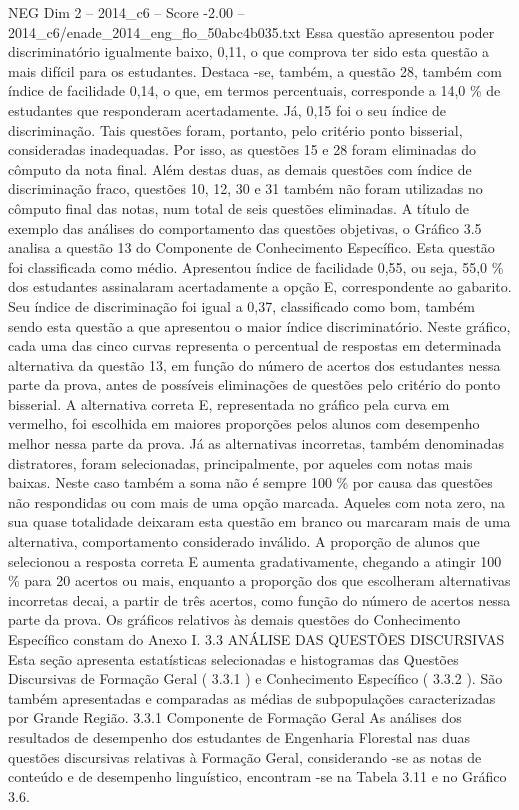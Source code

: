 \begin{textsample}{NEG Dim 2 – 2014\_c6 – Score -2.00 – 2014\_c6/enade\_2014\_eng\_flo\_50abc4b035.txt}
Essa questão apresentou poder discriminatório igualmente baixo, 0,11, o que comprova ter sido esta questão a mais difícil para os estudantes.
Destaca -se, também, a questão 28, também com índice de facilidade 0,14, o que, em termos percentuais, corresponde a 14,0 \% de estudantes que responderam acertadamente.
Já, 0,15 foi o seu índice de discriminação.
Tais questões foram, portanto, pelo critério ponto bisserial, consideradas inadequadas.
Por isso, as questões 15 e 28 foram eliminadas do cômputo da nota final.
Além destas duas, as demais questões com índice de discriminação fraco, questões 10, 12, 30 e 31 também não foram utilizadas no cômputo final das notas, num total de seis questões eliminadas.
A título de exemplo das análises do comportamento das questões objetivas, o Gráfico 3.5 analisa a questão 13 do Componente de Conhecimento Específico.
Esta questão foi classificada como médio.
Apresentou índice de facilidade 0,55, ou seja, 55,0 \% dos estudantes assinalaram acertadamente a opção E, correspondente ao gabarito.
Seu índice de discriminação foi igual a 0,37, classificado como bom, também sendo esta questão a que apresentou o maior índice discriminatório.
Neste gráfico, cada uma das cinco curvas representa o percentual de respostas em determinada alternativa da questão 13, em função do número de acertos dos estudantes nessa parte da prova, antes de possíveis eliminações de questões pelo critério do ponto bisserial.
A alternativa correta E, representada no gráfico pela curva em vermelho, foi escolhida em maiores proporções pelos alunos com desempenho melhor nessa parte da prova.
Já as alternativas incorretas, também denominadas distratores, foram selecionadas, principalmente, por aqueles com notas mais baixas.
Neste caso também a soma não é sempre 100 \% por causa das questões não respondidas ou com mais de uma opção marcada.
Aqueles com nota zero, na sua quase totalidade deixaram esta questão em branco ou marcaram mais de uma alternativa, comportamento considerado inválido.
A proporção de alunos que selecionou a resposta correta E aumenta gradativamente, chegando a atingir 100 \% para 20 acertos ou mais, enquanto a proporção dos que escolheram alternativas incorretas decai, a partir de três acertos, como função do número de acertos nessa parte da prova.
Os gráficos relativos às demais questões do Conhecimento Específico constam do Anexo I. 3.3 ANÁLISE DAS QUESTÕES DISCURSIVAS Esta seção apresenta estatísticas selecionadas e histogramas das Questões Discursivas de Formação Geral ( 3.3.1 ) e Conhecimento Específico ( 3.3.2 ).
São também apresentadas e comparadas as médias de subpopulações caracterizadas por Grande Região. 3.3.1 Componente de Formação Geral As análises dos resultados de desempenho dos estudantes de Engenharia Florestal nas duas questões discursivas relativas à Formação Geral, considerando -se as notas de conteúdo e de desempenho linguístico, encontram -se na Tabela 3.11 e no Gráfico 3.6.

\end{textsample}
